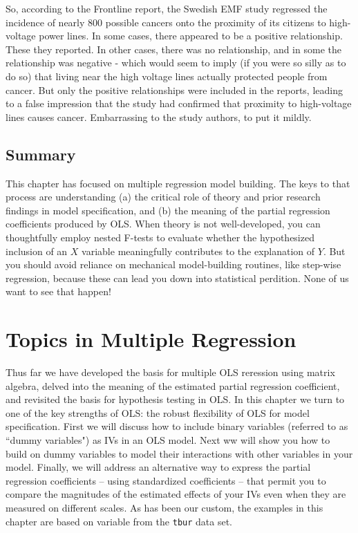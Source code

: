 \documentclass[11pt,openany]{book}\usepackage[]{graphicx}\usepackage[]{color}
\begin{document}
So, according to the Frontline report, the Swedish EMF study regressed the incidence of nearly  800 possible cancers onto the proximity of its citizens to high-voltage power lines. In some cases, there appeared to be a positive relationship. These they reported. In other cases, there was no relationship, and in some the relationship was negative - which would seem to imply (if you were so silly as to do so) that living near the high voltage lines actually protected people from cancer. But only the positive relationships were included in the reports, leading to a false impression that the study had confirmed that proximity to high-voltage lines causes cancer. Embarrassing to the study authors, to put it mildly.

\section{Summary}

This chapter has focused on multiple regression model building. The keys to that process are understanding (a) the critical role of theory and prior research findings in model specification, and (b) the meaning of the partial regression coefficients produced by OLS. When theory is not well-developed, you can thoughtfully employ nested F-tests to evaluate whether the hypothesized inclusion of an $X$ variable meaningfully contributes to the explanation of $Y$. But you should avoid reliance on mechanical model-building routines, like step-wise regression, because these can lead you down into statistical perdition. None of us want to see that happen!






\chapter{Topics in Multiple Regression}


Thus far we have developed the basis for multiple OLS reression using matrix algebra, delved into the meaning of the estimated partial regression coefficient, and revisited the basis for hypothesis testing in OLS. In this chapter we turn to one of the key strengths of OLS: the robust flexibility of OLS for model specification. First we will discuss how to include binary variables (referred to as ``dummy variables") as IVs in an OLS model. Next ww will show you how to build on dummy variables to model their interactions with other variables in your model. Finally, we will address an alternative way to express the partial regression coefficients -- using standardized coefficients -- that permit you to compare the magnitudes of the estimated effects of your IVs even when they are measured on different scales. As has been our custom, the examples in this chapter are based on variable from the \texttt{tbur} data set.  
\end{document}
